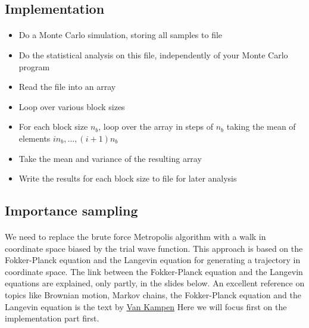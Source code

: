 \documentclass[%
twoside,                 %
final,                   %
10pt]{article}
\begin{document}
\noindent



\subsection*{Implementation}

\paragraph{}
\begin{itemize}
    \item Do a Monte Carlo simulation, storing all samples to file

    \item Do the statistical analysis on this file, independently of your Monte Carlo program

    \item Read the file into an array

    \item Loop over various block sizes

    \item For each block size $n_b$, loop over the array in steps of $n_b$ taking the mean of elements $i n_b,\ldots,(i+1) n_b$

    \item Take the mean and variance of the resulting array

    \item Write the results for each block size to file for later
      analysis
\end{itemize}

\noindent





\subsection*{Importance sampling}

\paragraph{}
We need to replace the brute force
Metropolis algorithm with a walk in coordinate space biased by the trial wave function.
This approach is based on the Fokker-Planck equation and the Langevin equation for generating a trajectory in coordinate space.  The link between the Fokker-Planck equation and the Langevin equations are explained, only partly, in the slides below.
An excellent reference on topics like Brownian motion, Markov chains, the Fokker-Planck equation and the Langevin equation is the text by  \href{{http://www.elsevier.com/books/stochastic-processes-in-physics-and-chemistry/van-kampen/978-0-444-52965-7}}{Van Kampen}
Here we will focus first on the implementation part first.
\end{document}
